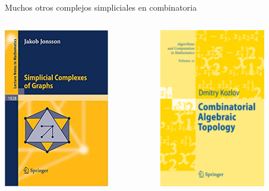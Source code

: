 \documentclass[spanish, presentation, aspectratio=169]{beamer}
\begin{document}
\begin{frame}[label={sec:orga1dd313}]{Muchos otros complejos simpliciales en combinatoria}
\begin{columns}
\begin{column}{0.5\columnwidth}
\begin{center}
\includegraphics[height=7cm]{scog.jpg}
\end{center}
\end{column}


\begin{column}{0.5\columnwidth}
\begin{center}
\includegraphics[height=7cm]{kozlov.jpg}
\end{center}
\end{column}
\end{columns}
\end{frame}
\end{document}
